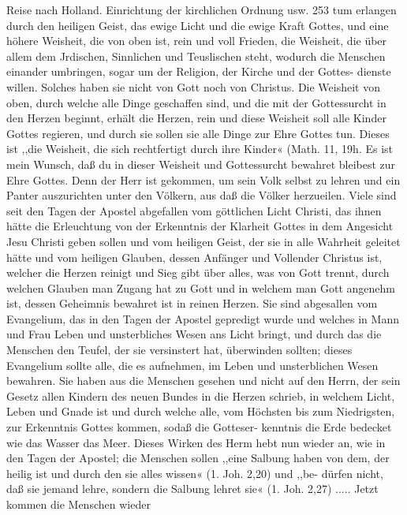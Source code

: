 Reise nach Holland. Einrichtung der kirchlichen Ordnung usw. 253
tum erlangen durch den heiligen Geist, das ewige Licht und die
ewige Kraft Gottes, und eine höhere Weisheit, die von oben ist,
rein und voll Frieden, die Weisheit, die über allem dem Jrdischen,
Sinnlichen und Teuslischen steht, wodurch die Menschen einander
umbringen, sogar um der Religion, der Kirche und der Gottes-
dienste willen. Solches haben sie nicht von Gott noch von Christus.
Die Weisheit von oben, durch welche alle Dinge geschaffen sind,
und die mit der Gottessurcht in den Herzen beginnt, erhält die
Herzen, rein und diese Weisheit soll alle Kinder Gottes regieren,
und durch sie sollen sie alle Dinge zur Ehre Gottes tun. Dieses ist
,,die Weisheit, die sich rechtfertigt durch ihre Kinder« (Math. 11, 19h.
Es ist mein Wunsch, daß du in dieser Weisheit und Gottessurcht
bewahret bleibest zur Ehre Gottes. Denn der Herr ist gekommen,
um sein Volk selbst zu lehren und ein Panter auszurichten unter
den Völkern, aus daß die Völker herzueilen. Viele sind seit den
Tagen der Apostel abgefallen vom göttlichen Licht Christi, das
ihnen hätte die Erleuchtung von der Erkenntnis der Klarheit
Gottes in dem Angesicht Jesu Christi geben sollen und vom heiligen
Geist, der sie in alle Wahrheit geleitet hätte und vom heiligen
Glauben, dessen Anfänger und Vollender Christus ist, welcher
die Herzen reinigt und Sieg gibt über alles, was von Gott trennt,
durch welchen Glauben man Zugang hat zu Gott und in welchem
man Gott angenehm ist, dessen Geheimnis bewahret ist in reinen
Herzen. Sie sind abgesallen vom Evangelium, das in den Tagen
der Apostel gepredigt wurde und welches in Mann und Frau
Leben und unsterbliches Wesen ans Licht bringt, und durch das
die Menschen den Teufel, der sie versinstert hat, überwinden
sollten; dieses Evangelium sollte alle, die es aufnehmen, im Leben
und unsterblichen Wesen bewahren. Sie haben aus die Menschen
gesehen und nicht auf den Herrn, der sein Gesetz allen Kindern
des neuen Bundes in die Herzen schrieb, in welchem Licht, Leben
und Gnade ist und durch welche alle, vom Höchsten bis zum
Niedrigsten, zur Erkenntnis Gottes kommen, sodaß die Gotteser-
kenntnis die Erde bedecket wie das Wasser das Meer. Dieses
Wirken des Herm hebt nun wieder an, wie in den Tagen der
Apostel; die Menschen sollen ,,eine Salbung haben von dem, der
heilig ist und durch den sie alles wissen« (1. Joh. 2,20) und ,,be-
dürfen nicht, daß sie jemand lehre, sondern die Salbung lehret
sie« (1. Joh. 2,27) ..... Jetzt kommen die Menschen wieder


